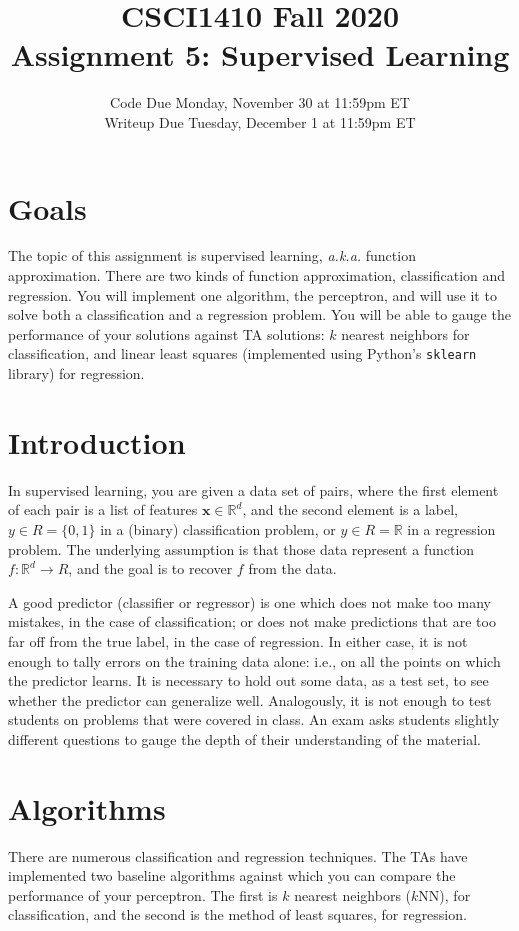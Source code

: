 \documentclass{article}
\title{CSCI1410 Fall 2020 \\
Assignment 5: Supervised Learning}
\date{Code Due Monday, November 30 at 11:59pm ET\\ [1ex]
Writeup Due Tuesday, December 1 at 11:59pm ET}
\begin{document}
\maketitle


\section{Goals}

The topic of this assignment is supervised learning, \emph{a.k.a.\/} function approximation.
There are two kinds of function approximation, classification and regression.
You will implement one algorithm, the perceptron, and will use it to solve both a classification and a regression problem.
You will be able to gauge the performance of your solutions against TA solutions:
$k$ nearest neighbors for classification,
and linear least squares (implemented using Python's \texttt{sklearn} library) for regression.


\section{Introduction}

In supervised learning, you are given a data set of pairs,
where the first element of each pair is a list of features $\bm{x} \in \mathbb{R}^{d}$,
and the second element is a label, $y \in R = \{ 0,1 \}$ in a (binary) classification problem,
or $y \in R = \mathbb{R}$ in a regression problem.
The underlying assumption is that those data represent a function $f: \mathbb{R}^{d} \to R$,
and the goal is to recover $f$ from the data.

A good predictor (classifier or regressor) is one which does not make too many mistakes, in the case of classification;
or does not make predictions that are too far off from the true label, in the case of regression.
In either case, it is not enough to tally errors on the training data alone: i.e., on all the points on which the predictor learns.
It is necessary to hold out some data, as a test set, to see whether the predictor can generalize well.
Analogously, it is not enough to test students on problems that were covered in class.
An exam asks students slightly different questions to gauge the depth of their understanding of the material.


\section{Algorithms}

There are numerous classification and regression techniques.
The TAs have implemented two baseline algorithms against which you can compare the performance of your perceptron.
The first is $k$ nearest neighbors ($k$NN), for classification,
and the second is the method of least squares, for regression.
\end{document}
